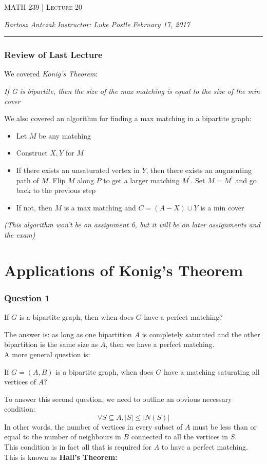 \documentclass{report}
\newcommand{\lectureNum}{20}
\newcommand{\curDate}{February 17, 2017}
\newcommand{\course}{MATH 239}
\newcommand{\instructor}{Luke Postle}
\begin{document}
\begin{center}
\begin{Large}
\textsc{\course{} | Lecture \lectureNum{}}
\end{Large}
\end{center} 
\noindent \textit{Bartosz Antczak} \hfill
\textit{Instructor: \instructor{}} \hfill
\textit{\curDate{}}
\rule{\textwidth}{0.4pt}
\subsubsection{Review of Last Lecture}
We covered \textit{Konig's Theorem}:
\begin{center}
\textit{If G is bipartite, then the size of the max matching is equal to the size of the min cover}
\end{center}
We also covered an algorithm for finding a max matching in a bipartite graph:
\begin{itemize}
\item Let $M$ be any matching
\item Construct $X, Y$ for $M$
\item If there exists an unsaturated vertex in $Y$, then there exists an augmenting path of $M$. Flip $M$ along $P$ to get a larger matching $M^\prime$. Set $M = M^\prime$ and go back to the previous step
\item If not, then $M$ is a max matching and $C = (A-X)\cup Y$ is a min cover
\end{itemize}
\textit{(This algorithm won't be on assignment 6, but it will be on later assignments and the exam)}
\section{Applications of Konig's Theorem}
\subsubsection{Question 1}
\begin{center}
If $G$ is a bipartite graph, then when does $G$ have a perfect matching?
\end{center}
The answer is: as long as one bipartition $A$ is completely saturated and the other bipartition is the same size as $A$, then we have a perfect matching.\\
A more general question is:
\begin{center}
If $G = (A,B)$ is a bipartite graph, when does $G$ have a matching saturating all vertices of $A$?
\end{center}
To answer this second question, we need to outline an obvious necessary condition:
$$\forall S \subseteq A, |S| \leq |N(S)|$$
In other words, the number of vertices in every subset of $A$ must be less than or equal to the number of neighbours in $B$ connected to all the vertices in $S$.\\This condition is in fact all that is required for $A$ to have a perfect matching. This is known as \textbf{Hall's Theorem:}
\end{document}
